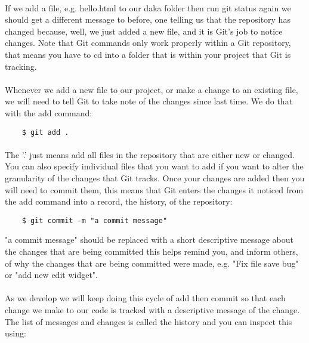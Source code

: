 \documentclass[10pt, a4paper]{article}
\begin{document}
\paragraph{} If we add a file, e.g. hello.html to our daka folder then run git status again we should get a different message to before, one telling us that the repository has changed because, well, we just added a new file, and it is Git's job to notice changes. Note that Git commands only work properly within a Git repository, that means you have to cd into a folder that is within your project that Git is tracking.

\paragraph{} Whenever we add a new file to our project, or make a change to an existing file, we will need to tell Git to take note of the changes since last time. We do that with the add command:

\begin{lstlisting}
    $ git add .
\end{lstlisting}

\paragraph{} The '.' just means add all files in the repository that are either new or changed. You can also specify individual files that you want to add if you want to alter the granularity of the changes that Git tracks. Once your changes are added then you will need to commit them, this means that Git enters the changes it noticed from the add command into a record, the history, of the repository:

\begin{lstlisting}
    $ git commit -m "a commit message"
\end{lstlisting}

"a commit message" should be replaced with a short descriptive message about the changes that are being committed this helps remind you, and inform others, of why the changes that are being committed were made, e.g. "Fix file save bug" or "add new edit widget".

\paragraph{} As we develop we will keep doing this cycle of add then commit so that each change we make to our code is tracked with a descriptive message of the change. The list of messages and changes is called the history and you can inspect this using:
    
\end{document}
